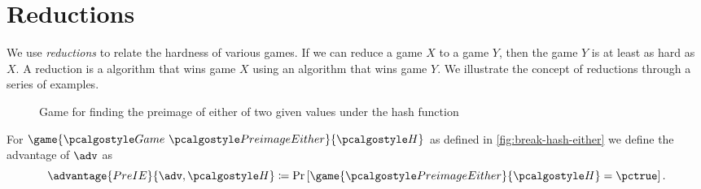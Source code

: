 \section{Reductions}
We use \emph{reductions} to relate the hardness of various games.
If we can reduce a game $X$ to a game $Y$, then the game $Y$ is at least as hard as $X$.
A reduction is a \ppt algorithm that wins game $X$ using an algorithm that wins game $Y$.
We illustrate the concept of reductions through a series of examples.

\begin{figure}[tbhp]
  \begin{center}
    \begin{tcolorbox}[width=7cm]
      \begin{pchstack}[center]
      \end{pchstack}
    \end{tcolorbox}
  \end{center}
  \caption{Game for finding the preimage of either of two given values under the hash function \label{fig:break-hash-either}}
\end{figure}


\begin{definition}
  For $\game{\Game~\algo{PreimageEither}}{\algo{H}}$ as defined in \autoref{fig:break-hash-either} we define the advantage of $\adv$ as
 \[
  \advantage{PreIE}{\adv, \algo{H}} \defeq \pr{\game{\algo{PreimageEither}}{\algo{H}} = \pctrue}.
 \]
\end{definition}

